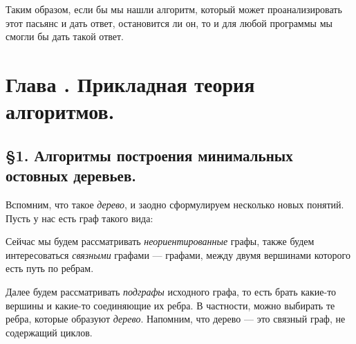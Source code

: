 \documentclass[russian]{lecture-notes}
\newcommand{\RomanNumeralCaps}[1]
{\MakeUppercase{\romannumeral #1}}
\begin{document}
	Таким образом, если бы мы нашли алгоритм, который может проанализировать этот пасьянс и дать ответ, остановится ли он,  то и для любой программы мы смогли бы дать такой ответ. 
	
	\section*{Глава \RomanNumeralCaps{5}. Прикладная теория алгоритмов.}
	
	\subsection*{\S1. Алгоритмы построения минимальных остовных деревьев.}
	
	Вспомним, что такое {\em дерево}, и заодно сформулируем несколько новых понятий. Пусть у нас есть граф такого вида:
	
	\begin{figure}[h]
		\centering
	\end{figure}
	
	Сейчас мы будем рассматривать {\em неориентированные} графы, также будем интересоваться {\em связными} графами --- графами, между двумя вершинами которого есть путь по ребрам. 
	
	Далее будем рассматривать {\em подграфы} исходного графа, то есть брать какие-то вершины и какие-то соединяющие их ребра. В частности, можно выбирать те ребра, которые образуют {\em дерево}. Напомним, что дерево --- это связный граф, не содержащий циклов. 
	
\end{document}
